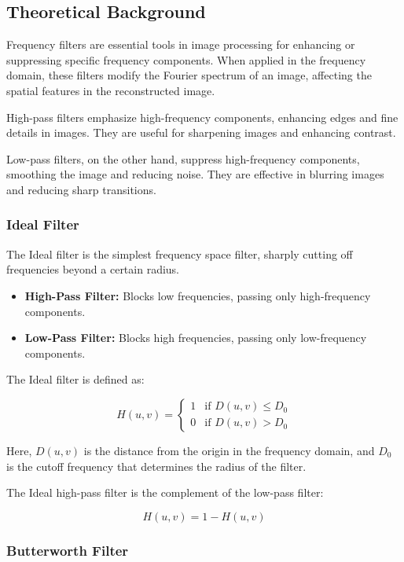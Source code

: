 \documentclass[a4paper,12pt]{article}
\begin{document}
\subsection{Theoretical Background}

Frequency filters are essential tools in image processing for enhancing or suppressing specific frequency components. When applied in the frequency domain, these filters modify the Fourier spectrum of an image, affecting the spatial features in the reconstructed image.

High-pass filters emphasize high-frequency components, enhancing edges and fine details in images. They are useful for sharpening images and enhancing contrast.

Low-pass filters, on the other hand, suppress high-frequency components, smoothing the image and reducing noise. They are effective in blurring images and reducing sharp transitions.

\subsubsection{Ideal Filter}

The Ideal filter is the simplest frequency space filter, sharply cutting off frequencies beyond a certain radius.
\begin{itemize}
    \item \textbf{High-Pass Filter:} Blocks low frequencies, passing only high-frequency components.
    \item \textbf{Low-Pass Filter:} Blocks high frequencies, passing only low-frequency components.
\end{itemize}

The Ideal filter is defined as:

\[
    H(u, v) = \begin{cases}
        1 & \text{if } D(u, v) \leq D_0 \\
        0 & \text{if } D(u, v) > D_0
    \end{cases}
\]

Here, \( D(u, v) \) is the distance from the origin in the frequency domain, and \( D_0 \) is the cutoff frequency that determines the radius of the filter.

The Ideal high-pass filter is the complement of the low-pass filter:

\[
    H(u, v) = 1 - H(u, v)
\]

\subsubsection{Butterworth Filter}
\end{document}

